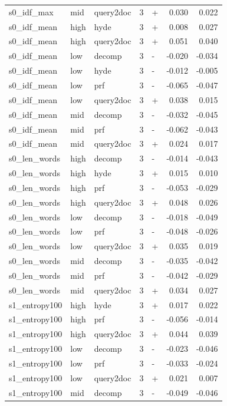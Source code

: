 \begin{table}
\begin{tabular}{lllrlrr}
s0\_idf\_max & mid & query2doc & 3 & + & 0.030 & 0.022 \\
s0\_idf\_mean & high & hyde & 3 & + & 0.008 & 0.027 \\
s0\_idf\_mean & high & query2doc & 3 & + & 0.051 & 0.040 \\
s0\_idf\_mean & low & decomp & 3 & - & -0.020 & -0.034 \\
s0\_idf\_mean & low & hyde & 3 & - & -0.012 & -0.005 \\
s0\_idf\_mean & low & prf & 3 & - & -0.065 & -0.047 \\
s0\_idf\_mean & low & query2doc & 3 & + & 0.038 & 0.015 \\
s0\_idf\_mean & mid & decomp & 3 & - & -0.032 & -0.045 \\
s0\_idf\_mean & mid & prf & 3 & - & -0.062 & -0.043 \\
s0\_idf\_mean & mid & query2doc & 3 & + & 0.024 & 0.017 \\
s0\_len\_words & high & decomp & 3 & - & -0.014 & -0.043 \\
s0\_len\_words & high & hyde & 3 & + & 0.015 & 0.010 \\
s0\_len\_words & high & prf & 3 & - & -0.053 & -0.029 \\
s0\_len\_words & high & query2doc & 3 & + & 0.048 & 0.026 \\
s0\_len\_words & low & decomp & 3 & - & -0.018 & -0.049 \\
s0\_len\_words & low & prf & 3 & - & -0.048 & -0.026 \\
s0\_len\_words & low & query2doc & 3 & + & 0.035 & 0.019 \\
s0\_len\_words & mid & decomp & 3 & - & -0.035 & -0.042 \\
s0\_len\_words & mid & prf & 3 & - & -0.042 & -0.029 \\
s0\_len\_words & mid & query2doc & 3 & + & 0.034 & 0.027 \\
s1\_entropy100 & high & hyde & 3 & + & 0.017 & 0.022 \\
s1\_entropy100 & high & prf & 3 & - & -0.056 & -0.014 \\
s1\_entropy100 & high & query2doc & 3 & + & 0.044 & 0.039 \\
s1\_entropy100 & low & decomp & 3 & - & -0.023 & -0.046 \\
s1\_entropy100 & low & prf & 3 & - & -0.033 & -0.024 \\
s1\_entropy100 & low & query2doc & 3 & + & 0.021 & 0.007 \\
s1\_entropy100 & mid & decomp & 3 & - & -0.049 & -0.046 \\

\end{tabular}
\end{table}

